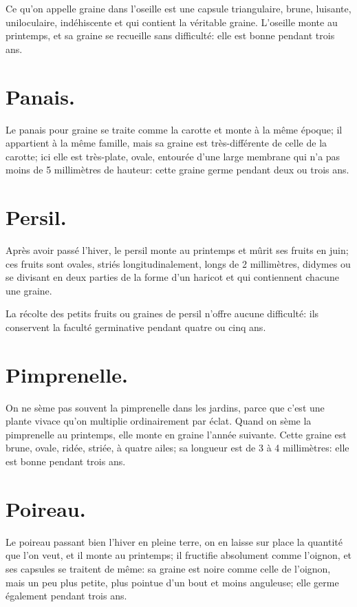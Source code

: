 \documentclass[10pt,a4paper]{book}
\begin{document}
Ce qu'on appelle graine dans l'oseille est une capsule triangulaire, brune, luisante, uniloculaire, indéhiscente et qui contient la véritable graine. L'oseille monte au printemps, et sa graine se recueille sans difficulté: elle est bonne pendant trois ans.

\section{Panais.}

Le panais pour graine se traite comme la carotte et monte à la même époque; il appartient à la même famille, mais sa graine est très-différente de celle de la carotte; ici elle est très-plate, ovale, entourée d'une large membrane qui n'a pas moins de 5 millimètres de hauteur: cette graine germe pendant deux ou trois ans.

\section{Persil.}

Après avoir passé l'hiver, le persil monte au printemps et mûrit ses fruits en juin; ces fruits sont ovales, striés longitudinalement, longs de 2 millimètres, didymes ou se divisant en deux parties de la forme d'un haricot et qui contiennent chacune une graine.

La récolte des petits fruits ou graines de persil n'offre aucune difficulté: ils conservent la faculté germinative pendant quatre ou cinq ans.

\section{Pimprenelle.}

On ne sème pas souvent la pimprenelle dans les jardins, parce que c'est une plante vivace qu'on multiplie ordinairement par éclat. Quand on sème la pimprenelle au printemps, elle monte en graine l'année suivante. Cette graine est brune, ovale, ridée, striée, à quatre ailes; sa longueur est de 3 à 4 millimètres: elle est bonne pendant trois ans.

\section{Poireau.}

Le poireau passant bien l'hiver en pleine terre, on en laisse sur place la quantité que l'on veut, et il monte au printemps; il fructifie absolument comme l'oignon, et ses capsules se traitent de même: sa graine est noire comme celle de l'oignon, mais un peu plus petite, plus pointue d'un bout et moins anguleuse; elle germe également pendant trois ans.
\end{document}
